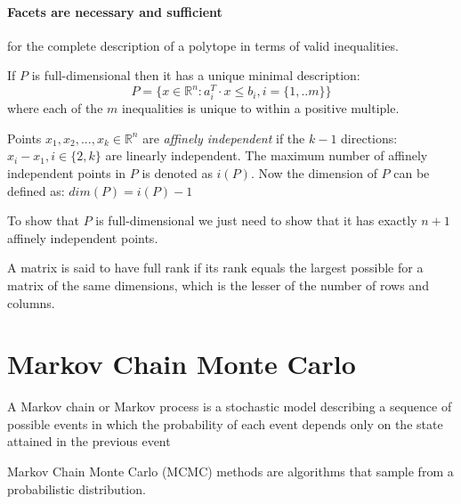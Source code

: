    \paragraph{Facets are necessary and sufficient} for the complete description of a polytope 
   in terms of valid inequalities.




      If $P$ is full-dimensional then it has a unique minimal description: 
      \begin{equation}
         P = \{ x \in \mathbb{R}^n : a_{i}^T \cdot x \leq b_{i}, i = \{1, ..m\} \}
      \end{equation}
      where each of the $m$ inequalities is unique to within a positive multiple.
   



   Points $ x_{1}, x_{2}, ... , x_{k} \in \mathbb{R}^n$ are \textit{affinely independent}
   if the $k-1$ directions: 
   $x_{i} - x_{1}, i \in \{2, k\}$
   are linearly independent. 
   The maximum number of affinely independent points in $P$ is denoted as $i(P)$. 
   Now the dimension of $P$ can be defined as:
   $dim(P) = i(P) - 1$

   To show that $P$ is full-dimensional we just need to 
   show that it has exactly $n+1$ affinely independent points. 

   A matrix is said to have full rank if its rank equals the largest possible for a matrix of the same dimensions, which is the lesser of the number of rows and columns. 






\section*{Markov Chain Monte Carlo}
\label{  }

      \begin{definition}
         A Markov chain or Markov process is a stochastic model describing a sequence of possible events in which the probability of each event depends only on the state attained in the previous event
      \end{definition}
   
      Markov Chain Monte Carlo (MCMC) methods are algorithms that sample from a probabilistic distribution. 


